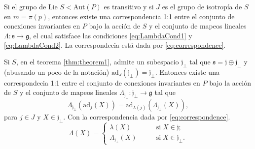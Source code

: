 \begin{thm}
\label{thm:theorem1}
Si el grupo de Lie $S < \mathrm{Aut} (P)$ es transitivo y si $J$ es el grupo de isotrop\'{i}a de $S$ en $m = \pi(p)$, entonces existe una correspondencia 1:1 entre el conjunto de conexiones invariantes en $P$ bajo la acci\'{o}n de $S$ y el conjunto de mapeos lineales $\Lambda: \mathfrak{s} \longrightarrow \mathfrak{g}$, el cual satisface las condiciones \eqref{eq:LambdaCond1} y \eqref{eq:LambdaCond2}. La correspondecia est\'{a} dada por \eqref{eq:correspondence}.
\end{thm}

\begin{thm}
Si $S$, en el teorema \ref{thm:theorem1}, admite un subespacio $\mathfrak{j}_{\perp}$ tal que $\mathfrak{s} = \mathfrak{j} \oplus \mathfrak{j}_{\perp}$ y (abusando un poco de la notaci\'{o}n) $\mathrm{ad}_{J} (\mathfrak{j}_{\perp}) = \mathfrak{j}_{\perp}$. Entonces existe una correspondecia 1:1 entre el conjunto de conexiones invariantes en $P$ bajo la acci\'{o}n de $S$ y el conjunto de mapeos lineales $\Lambda_{\mathfrak{j}_{\perp}}: \mathfrak{j}_{\perp} \longrightarrow \mathfrak{g}$ tal que
%
\begin{equation}
\label{eq:HiggsField}
\Lambda_{\mathfrak{j}_{\perp}} (\mathrm{ad}_{j} (X)) = \mathrm{ad}_{\lambda (j)} (\Lambda_{\mathfrak{j}_{\perp}} (X)),
\end{equation}
%
para $j \in J$ y $X \in \mathfrak{j}_{\perp}$. Con la correspondencia dada por \eqref{eq:correspondence}.
%
$$
\Lambda (X) = 
\begin{cases}
\lambda (X) \qquad & \mathrm{si} \; X\in \mathfrak{j}; \\
\Lambda_{\mathfrak{j}_{\perp}} (X) \qquad & \mathrm{si} \; X \in \mathfrak{j}_{\perp}.
\end{cases}
$$
%
\end{thm}

